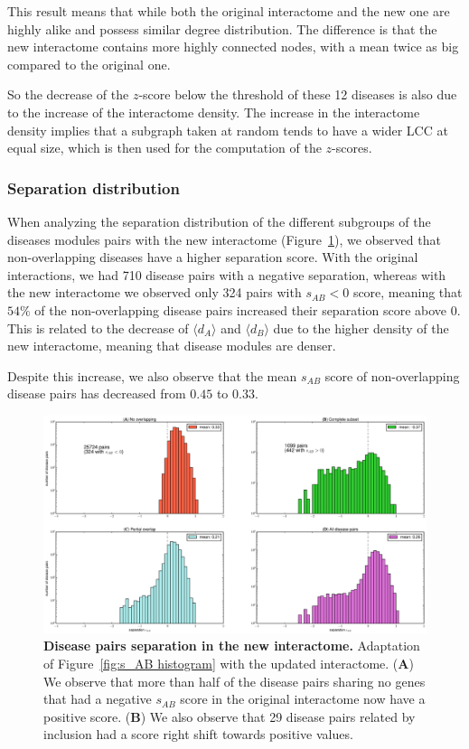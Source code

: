 \documentclass[letterpaper]{article}
\begin{document}
	This result means that while both the original interactome and the new one are highly alike and possess
	similar degree distribution. The difference is that the new interactome contains more highly connected
	nodes, with a mean twice as big compared to the original one.

	So the decrease of the $z$-score below the threshold of these 12 diseases is also due to the increase of
	the interactome density. The increase in the interactome density implies that a subgraph taken at random
	tends to have a wider LCC at equal size, which is then used for the computation of the $z$-scores.

\subsubsection{Separation distribution}
	When analyzing the separation distribution of the different subgroups of the diseases modules pairs with
	the new interactome (Figure~\ref{fig:new interactome s_AB}), we observed that non-overlapping diseases have
	a higher separation score. With the original interactions, we had 710 disease pairs with a negative separation,
	whereas with the new interactome we observed only 324 pairs with $s_{AB} < 0$ score, meaning that
	$54\%$ of the non-overlapping disease pairs increased their separation score above 0. This is related to the
	decrease of $\langle d_A \rangle$ and $\langle d_B \rangle$ due to the higher density of the new interactome,
	meaning that disease modules are denser.

	Despite this increase, we also observe that the mean $s_{AB}$ score of non-overlapping disease pairs has
	decreased from $0.45$ to $0.33$.

	\begin{figure}[!t]
		\hspace{-2.2cm}
		\vspace{-1cm}
		\includegraphics[scale=.36]{images/new_interactome_s_AB_histogram.eps}
		\caption{{\bf Disease pairs separation in the new interactome.} Adaptation of Figure~\ref{fig:s_AB histogram} with the
		updated interactome.
		({\bf A}) We observe that more than half of the disease pairs sharing no genes that had a negative $s_{AB}$ score
		in the original interactome now have a positive score.
		({\bf B}) We also observe that 29 disease pairs related by inclusion had a score right shift towards positive values.
		\label{fig:new interactome s_AB}}
		\vspace{-.5cm}
	\end{figure}
\end{document}
